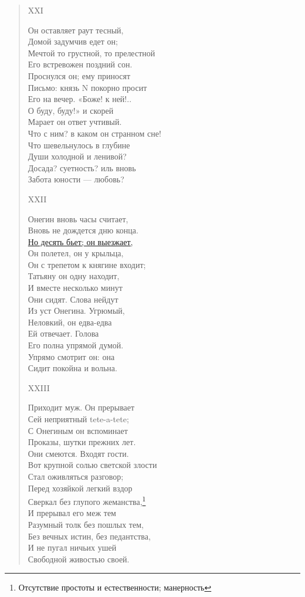 \begin{verse}
XXI

Он оставляет раут тесный,\\
Домой задумчив едет он;\\
Мечтой то грустной, то прелестной\\
Его встревожен поздний сон.\\
Проснулся он; ему приносят\\
Письмо: князь N покорно просит\\
Его на вечер. «Боже! к ней!..\\
О буду, буду!» и скорей\\
Марает он ответ учтивый.\\
Что с ним? в каком он странном сне!\\
Что шевельнулось в глубине\\
Души холодной и ленивой?\\
Досада? суетность? иль вновь\\
Забота юности — любовь?

XXII

Онегин вновь часы считает,\\
Вновь не дождется дню конца.\\
\hyperref[serata]{Но десять бьет; он выезжает,}\\
Он полетел, он у крыльца,\\
Он с трепетом к княгине входит;\\
Татьяну он одну находит,\\
И вместе несколько минут\\
Они сидят. Слова нейдут\\
Из уст Онегина. Угрюмый,\\
Неловкий, он едва-едва\\
Ей отвечает. Голова\\
Его полна упрямой думой.\\
Упрямо смотрит он: она\\
Сидит покойна и вольна.

XXIII

Приходит муж. Он прерывает\\
Сей неприятный tete-a-tete;\\
С Онегиным он вспоминает\\
Проказы, шутки прежних лет.\\
Они смеются. Входят гости.\\
Вот крупной солью светской злости\\
Стал оживляться разговор;\\
Перед хозяйкой легкий вздор\\
Сверкал без глупого жеманства,\footnote{Отсутствие простоты и естественности; манерность}\\
И прерывал его меж тем\\
Разумный толк без пошлых тем,\\
Без вечных истин, без педантства,\\
И не пугал ничьих ушей\\
Свободной живостью своей.


\end{verse}
